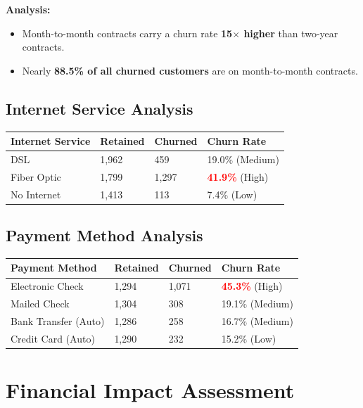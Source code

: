 \documentclass[11pt,a4paper]{article}
\newcommand{\risk}[1]{\textbf{\textcolor{red}{#1}}}
\begin{document}
\textbf{Analysis:}
\begin{itemize}
    \item Month-to-month contracts carry a churn rate \textbf{15$\times$ higher} than two-year contracts.
    \item Nearly \textbf{88.5\% of all churned customers} are on month-to-month contracts.
\end{itemize}

\subsection{Internet Service Analysis}

\begin{table}[h!]
\centering
\begin{tabularx}{\textwidth}{l l l l}
\toprule
\textbf{Internet Service} & \textbf{Retained} & \textbf{Churned} & \textbf{Churn Rate} \\
\midrule
DSL & 1,962 & 459 & 19.0\% (Medium) \\
Fiber Optic & 1,799 & 1,297 & \risk{41.9\%} (High) \\
No Internet & 1,413 & 113 & 7.4\% (Low) \\
\bottomrule
\end{tabularx}
\end{table}

\subsection{Payment Method Analysis}

\begin{table}[h!]
\centering
\begin{tabularx}{\textwidth}{l l l l}
\toprule
\textbf{Payment Method} & \textbf{Retained} & \textbf{Churned} & \textbf{Churn Rate} \\
\midrule
Electronic Check & 1,294 & 1,071 & \risk{45.3\%} (High) \\
Mailed Check & 1,304 & 308 & 19.1\% (Medium) \\
Bank Transfer (Auto) & 1,286 & 258 & 16.7\% (Medium) \\
Credit Card (Auto) & 1,290 & 232 & 15.2\% (Low) \\
\bottomrule
\end{tabularx}
\end{table}

\newpage

\section{Financial Impact Assessment}
\end{document}
